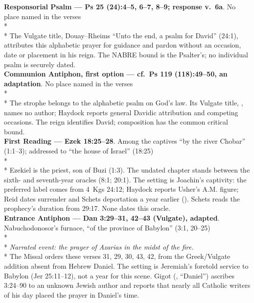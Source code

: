 \begin{passagedossiertable}
\textbf{Responsorial Psalm --- Ps 25 (24):4--5, 6--7, 8--9; response v.~6a}. No place
named in the verses\\*
\\*
The Vulgate title, Douay--Rheims ``Unto the end, a psalm for David'' (24:1), attributes this alphabetic prayer for guidance and pardon without an occasion, date or placement in his reign. The NABRE bound is the Psalter's; no individual psalm is securely dated.\\
\midrule
\textbf{Communion Antiphon, first option --- cf.\ Ps 119 (118):49--50, an adaptation}. No place named in the verses\\*
\\*
The  strophe belongs to the alphabetic psalm on God's law. Its Vulgate title, , names no author; Haydock reports general Davidic attribution and competing occasions. The reign identifies David; composition has the common critical bound.\\
\midrule
\textbf{First Reading --- Ezek 18:25--28}. Among the captives ``by the river Chobar''
(1:1--3); addressed to ``the house of Israel'' (18:25)\\*
\\*
Ezekiel is the priest, son of Buzi (1:3). The undated chapter stands between the sixth- and seventh-year oracles (8:1; 20:1). The setting is Joachin's captivity: the preferred label comes from 4~Kgs 24:12; Haydock reports Usher's A.M. figure; Reid dates surrender and Schets deportation a year earlier (). Schets reads the prophecy's duration from 29:17. None dates this oracle.\\
\midrule
\textbf{Entrance Antiphon --- Dan 3:29--31, 42--43 (Vulgate), adapted}. Nabuchodonosor's
furnace, ``of the province of Babylon'' (3:1, 20--25)\\*
\\*
\textit{Narrated event: the prayer of Azarias in the midst of the fire.}\\*
The Missal orders these verses 31, 29, 30, 43, 42, from the Greek/Vulgate addition absent from Hebrew Daniel. The setting is Jeremiah's foretold service to Babylon (Jer 25:11--12), not a year for this scene. Gigot (, ``Daniel'') ascribes 3:24--90 to an unknown Jewish author and reports that nearly all Catholic writers of his day placed the prayer in Daniel's time.\\

\end{passagedossiertable}
